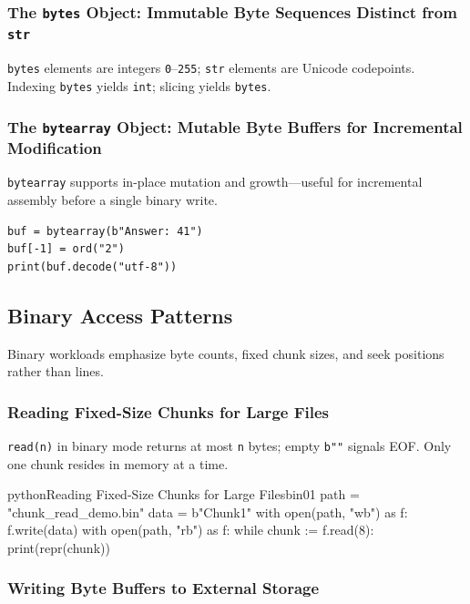 \documentclass[a4paper,twoside]{report}
\begin{document}
\subsubsection{The \texttt{bytes} Object: Immutable Byte Sequences Distinct from \texttt{str}}

\texttt{bytes} elements are integers \texttt{0}--\texttt{255}; \texttt{str} elements are Unicode codepoints. Indexing \texttt{bytes} yields \texttt{int}; slicing yields \texttt{bytes}.

\subsubsection{The \texttt{bytearray} Object: Mutable Byte Buffers for Incremental Modification}

\texttt{bytearray} supports in-place mutation and growth---useful for incremental assembly before a single binary write.

\begin{verbatim}
buf = bytearray(b"Answer: 41")
buf[-1] = ord("2")
print(buf.decode("utf-8"))
\end{verbatim}


\subsection{Binary Access Patterns}

Binary workloads emphasize byte counts, fixed chunk sizes, and seek positions rather than lines.

\subsubsection{Reading Fixed-Size Chunks for Large Files}

\texttt{read(n)} in binary mode returns at most \texttt{n} bytes; empty \texttt{b""} signals EOF. Only one chunk resides in memory at a time.

\begin{codebox}[]{python}{Reading Fixed-Size Chunks for Large Files}{bin01}
path = "chunk_read_demo.bin"
data = b"Chunk1\n"
with open(path, "wb") as f:
    f.write(data)
with open(path, "rb") as f:
    while chunk := f.read(8):
        print(repr(chunk))
\end{codebox}


\subsubsection{Writing Byte Buffers to External Storage}
\end{document}
